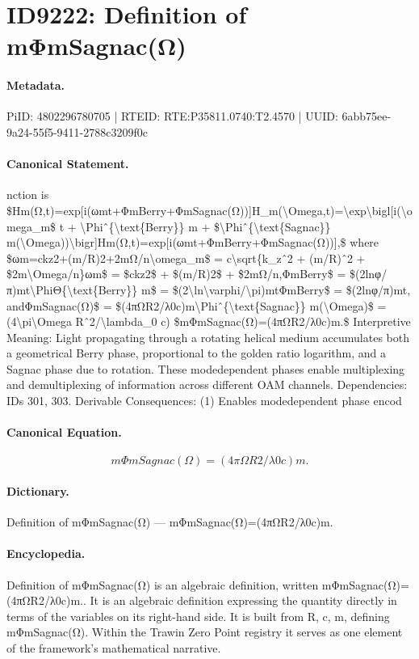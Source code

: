 \section*{ID9222: Definition of mΦmSagnac(Ω)}
\paragraph{Metadata.}
PiID: 4802296780705 | RTEID: RTE:P35811.0740:T2.4570 | UUID: 6abb75ee-9a24-55f5-9411-2788c3209f0c

\paragraph{Canonical Statement.}
nction is \$Hm(Ω,t)=exp[i(ωmt+ΦmBerry+ΦmSagnac(Ω))]H\_m(\textbackslash{}Omega,t)=\textbackslash{}exp\textbackslash{}bigl[i(\textbackslash{}omega\_m\$ t + \textbackslash{}Phiˆ\{\textbackslash{}text\{Berry\}\} m + \$\textbackslash{}Phiˆ\{\textbackslash{}text\{Sagnac\}\} m(\textbackslash{}Omega))\textbackslash{}bigr]Hm(Ω,t)=exp[i(ωmt+ΦmBerry+ΦmSagnac(Ω))],\$ where \$ωm=ckz2+(m/R)2+2mΩ/n\textbackslash{}omega\_m\$ = c\textbackslash{}sqrt\{k\_zˆ2 + (m/R)ˆ2 + \$2m\textbackslash{}Omega/n\}ωm\$ = \$ckz2\$ + \$(m/R)2\$ + \$2mΩ/n,ΦmBerry\$ = \$(2lnφ/π)mt\textbackslash{}PhiΘ\{\textbackslash{}text\{Berry\}\} m\$ = \$(2\textbackslash{}ln\textbackslash{}varphi/\textbackslash{}pi)mtΦmBerry\$ = \$(2lnφ/π)mt, andΦmSagnac(Ω)\$ = \$(4πΩR2/λ0c)m\textbackslash{}Phiˆ\{\textbackslash{}text\{Sagnac\}\} m(\textbackslash{}Omega)\$ = (4\textbackslash{}pi\textbackslash{}Omega Rˆ2/\textbackslash{}lambda\_0 c) \$mΦmSagnac(Ω)=(4πΩR2/λ0c)m.\$ Interpretive Meaning: Light propagating through a rotating helical medium accumulates both a geometrical Berry phase, proportional to the golden ratio logarithm, and a Sagnac phase due to rotation. These modedependent phases enable multiplexing and demultiplexing of information across different OAM channels. Dependencies: IDs 301, 303. Derivable Consequences: (1) Enables modedependent phase encod

\paragraph{Canonical Equation.}
\[
mΦmSagnac(Ω)=(4πΩR2/λ0c)m.
\]

\paragraph{Dictionary.}
Definition of mΦmSagnac(Ω) — mΦmSagnac(Ω)=(4πΩR2/λ0c)m.

\paragraph{Encyclopedia.}
Definition of mΦmSagnac(Ω) is an algebraic definition, written mΦmSagnac(Ω)=(4πΩR2/λ0c)m.. It is an algebraic definition expressing the quantity directly in terms of the variables on its right-hand side. It is built from R, c, m, defining mΦmSagnac(Ω). Within the Trawin Zero Point registry it serves as one element of the framework's mathematical narrative.
